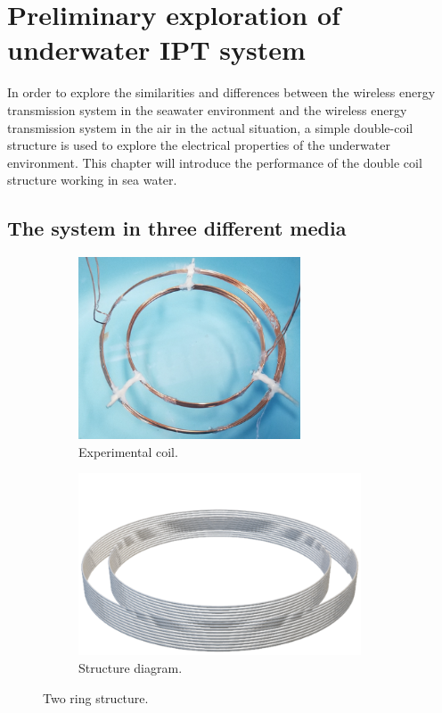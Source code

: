\chapter{Preliminary exploration of underwater IPT system}

In order to explore the similarities and differences between the wireless energy transmission system in the seawater environment and the wireless energy transmission system in the air in the actual situation, a simple double-coil structure is used to explore the electrical properties of the underwater environment. This chapter will introduce the performance of the double coil structure working in sea water.




\section{The system in three different media}

\begin{figure}[htbp]
    \begin{subfigure}{0.5\textwidth}
        \centering
        \includegraphics[width=0.9\linewidth, height=5.4cm]{images/3_two_ring_coil.png}
        \caption{Experimental coil.}
        \label{fig:subim1}
    \end{subfigure}
    \begin{subfigure}{0.5\textwidth}
        \centering
        \includegraphics[width=0.9\linewidth, height=5.4cm]{images/3_two_ring_coil_structure.png}
        \caption{Structure diagram.}
        \label{fig:subim2}
    \end{subfigure}

    \caption{Two ring structure.}
    \label{fig:3_two_ring_coil}
\end{figure}

